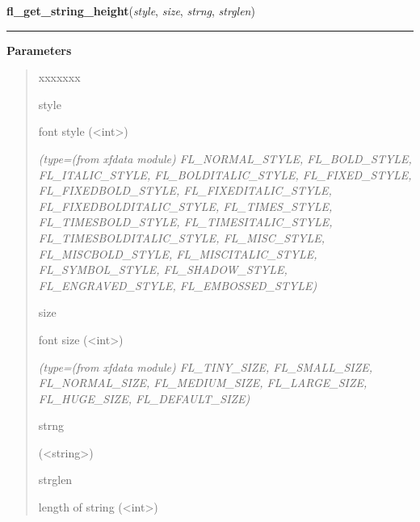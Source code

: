     \label{xformslib:library:fl_get_string_height}

    \vspace{0.5ex}

\hspace{.8\funcindent}\begin{boxedminipage}{\funcwidth}

    \raggedright \textbf{fl\_get\_string\_height}(\textit{style}, \textit{size}, \textit{strng}, \textit{strglen})

    \vspace{-1.5ex}

    \rule{\textwidth}{0.5\fboxrule}
\setlength{\parskip}{2ex}
\setlength{\parskip}{1ex}
      \textbf{Parameters}
      \vspace{-1ex}

      \begin{quote}
        \begin{Ventry}{xxxxxxx}

          \item[style]

          font style ({\textless}int{\textgreater})

            {\it (type=(from xfdata module) FL\_NORMAL\_STYLE, FL\_BOLD\_STYLE, FL\_ITALIC\_STYLE,
FL\_BOLDITALIC\_STYLE, FL\_FIXED\_STYLE, FL\_FIXEDBOLD\_STYLE, 
FL\_FIXEDITALIC\_STYLE, FL\_FIXEDBOLDITALIC\_STYLE, FL\_TIMES\_STYLE, 
FL\_TIMESBOLD\_STYLE, FL\_TIMESITALIC\_STYLE, FL\_TIMESBOLDITALIC\_STYLE, 
FL\_MISC\_STYLE, FL\_MISCBOLD\_STYLE, FL\_MISCITALIC\_STYLE, 
FL\_SYMBOL\_STYLE, FL\_SHADOW\_STYLE, FL\_ENGRAVED\_STYLE, 
FL\_EMBOSSED\_STYLE)}

          \item[size]

          font size ({\textless}int{\textgreater})

            {\it (type=(from xfdata module) FL\_TINY\_SIZE, FL\_SMALL\_SIZE, FL\_NORMAL\_SIZE, 
FL\_MEDIUM\_SIZE, FL\_LARGE\_SIZE, FL\_HUGE\_SIZE, FL\_DEFAULT\_SIZE)}

          \item[strng]

          ({\textless}string{\textgreater})

          \item[strglen]

          length of string ({\textless}int{\textgreater})


\end{Ventry}
\end{quote}
\end{boxedminipage}
